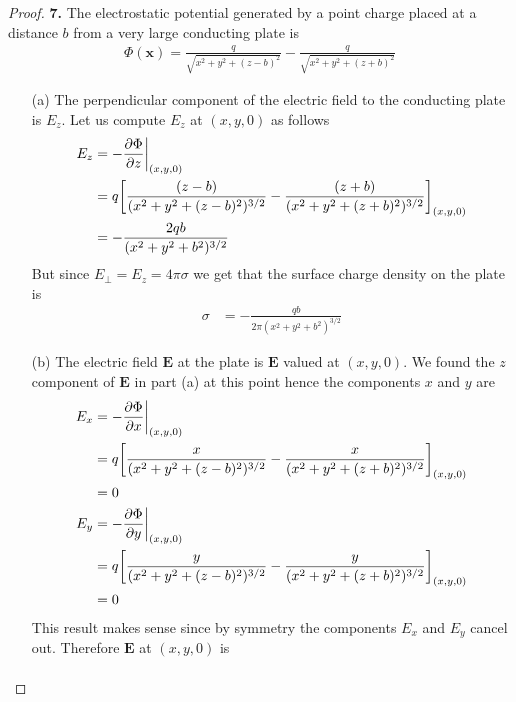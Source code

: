 \documentclass[11pt]{article}
\theoremstyle{definition}
\begin{document}
\cleardoublepage
\begin{proof}{\textbf{7.}}
    The electrostatic potential generated by a point charge placed at a
    distance $b$ from a very large conducting plate is 
    \begin{align*}
        \Phi(\bm{x}) = \frac{q}{\sqrt{x^2 + y^2 + (z - b)^2}}
        - \frac{q}{\sqrt{x^2 + y^2 + (z + b)^2}}
    \end{align*}
\begin{itemize}
    \item [(a)] The perpendicular component of the electric field to the
    conducting plate is $E_z$. Let us compute $E_z$ at $(x, y, 0)$ as follows 
    \begin{align*}
        E_z &= -\pdv{\Phi}{z}\bigg|_{(x, y, 0)}\\
        &= q\bigg[
            \frac{(z - b)}{(x^2 + y^2 + (z - b)^2)^{3/2}}
            - \frac{(z + b)}{(x^2 + y^2 + (z + b)^2)^{3/2}}
        \bigg]_{(x, y, 0)}\\
        &= -\frac{2qb}{(x^2 + y^2 + b^2)^{3/2}}
    \end{align*}
    But since $E_{\perp} = E_z = 4\pi\sigma$ we get that the surface charge
    density on the plate is
    \begin{align*}
        \sigma &= -\frac{qb}{2\pi(x^2 + y^2 + b^2)^{3/2}}
    \end{align*}
    \item [(b)] The electric field $\bm{E}$ at the plate is $\bm{E}$ valued at
    $(x,y,0)$. We found the $z$ component of $\bm{E}$ in part (a) at this point
    hence the components $x$ and $y$ are
    \begin{align*}
        E_x &= -\pdv{\Phi}{x}\bigg|_{(x, y, 0)}\\
        &= q\bigg[
            \frac{x}{(x^2 + y^2 + (z - b)^2)^{3/2}}
            - \frac{x}{(x^2 + y^2 + (z + b)^2)^{3/2}}
        \bigg]_{(x, y, 0)}\\
        &= 0\\
        E_y &= -\pdv{\Phi}{y}\bigg|_{(x, y, 0)}\\
        &= q\bigg[
            \frac{y}{(x^2 + y^2 + (z - b)^2)^{3/2}}
            - \frac{y}{(x^2 + y^2 + (z + b)^2)^{3/2}}
        \bigg]_{(x, y, 0)}\\
        &= 0
    \end{align*}
    This result makes sense since by symmetry the components $E_x$ and $E_y$
    cancel out. Therefore $\bm{E}$ at $(x,y,0)$ is 
    \begin{align*}

\end{align*}
\end{itemize}
\end{proof}
\end{document}
